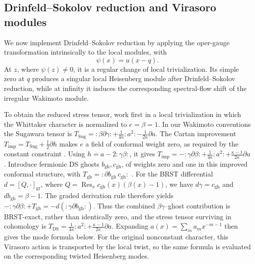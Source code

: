 \documentclass[a4paper,11pt]{article}
\numberwithin{equation}{section}
\begin{document}
\subsection{Drinfeld--Sokolov reduction and Virasoro modules}
\label{subsection:PII DS local modules}

We now implement Drinfeld--Sokolov reduction \cite{DrinfeldSokolov1985}
by applying the oper-gauge transformation intrinsically to the local modules, with
\begin{equation}
	\psi(x)=u(x-q).
\end{equation}
At $z$, where $\psi(z)\neq 0$, it is a regular change of local trivialization.  Its simple zero at $q$ produces a singular local Heisenberg module after Drinfeld--Sokolov reduction, while at infinity it induces the corresponding spectral-flow shift of the irregular Wakimoto module.

To obtain the reduced stress tensor, work first in a local
trivialization in which the Whittaker character is normalized to
$e=\beta=1$.  In our Wakimoto conventions the Sugawara tensor is
$T_{\mathrm{Sug}}=:\beta\partial\gamma:
+\frac{1}{4\kappa}:a^{2}:-\frac{1}{2\kappa}\partial a$.
The Cartan improvement
$T_{\mathrm{imp}}=T_{\mathrm{Sug}}+\frac12\partial h$
makes $e$ a field of conformal weight zero, as required by the
constant constraint
\cite[Section~2.2, equation~(2.5) and
Theorems~2.2--2.3]{KacRoanWakimoto2003}.
Using $h=a-2:\gamma\beta:$, it gives
$T_{\mathrm{imp}}=-:\gamma\partial\beta:
+\frac{1}{4\kappa}:a^{2}:
+\frac{\kappa-1}{2\kappa}\partial a$.
Introduce fermionic DS ghosts $b_{\mathrm{gh}},c_{\mathrm{gh}}$,
of weights zero and one in this improved conformal structure, with
$T_{\mathrm{gh}}=:\partial b_{\mathrm{gh}}\,c_{\mathrm{gh}}:$
\cite[Example~1.3 and Theorem~2.2(b)]{KacRoanWakimoto2003}.
For the BRST differential
$d=[Q,\cdot]_{\mathrm{gr}}$, where
$Q=\operatorname{Res}_{x}c_{\mathrm{gh}}(x)(\beta(x)-1)$,
we have $d\gamma=c_{\mathrm{gh}}$ and
$db_{\mathrm{gh}}=\beta-1$.  The graded derivation rule therefore
yields
$-:\gamma\partial\beta:+T_{\mathrm{gh}}
=-d(:\gamma\partial b_{\mathrm{gh}}:)$.
Thus the combined $\beta\gamma$--ghost contribution is BRST-exact,
rather than identically zero, and the stress tensor surviving in
cohomology is
$T_{\mathrm{DS}}=\frac{1}{4\kappa}:a^{2}:
+\frac{\kappa-1}{2\kappa}\partial a$.
Expanding $a(x)=\sum_m a_m x^{-m-1}$ then gives the mode formula
below.  For the original nonconstant character, this Virasoro action
is transported by the local twist, so the same formula is evaluated
on the corresponding twisted Heisenberg modes.
\end{document}

